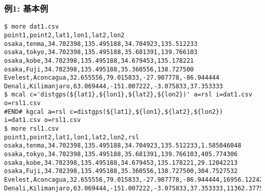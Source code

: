 \subsubsection*{例1: 基本例}



\begin{Verbatim}[baselinestretch=0.7,frame=single]
$ more dat1.csv
point1,point2,lat1,lon1,lat2,lon2
osaka,tenma,34.702398,135.495188,34.704923,135.512233
osaka,tokyo,34.702398,135.495188,35.681391,139.766103
osaka,kobe,34.702398,135.495188,34.679453,135.178221
osaka,Fuji,34.702398,135.495188,35.360556,138.727500
Evelest,Aconcagua,32.655556,79.015833,-27.987778,-86.944444
Denali,Kilimanjaro,63.069444,-151.007222,-3.075833,37.353333
$ mcal c='distgps(${lat1},${lon1},${lat2},${lon2})' a=rsl i=dat1.csv o=rsl1.csv
#END# kgcal a=rsl c=distgps(${lat1},${lon1},${lat2},${lon2}) i=dat1.csv o=rsl1.csv
$ more rsl1.csv
point1,point2,lat1,lon1,lat2,lon2,rsl
osaka,tenma,34.702398,135.495188,34.704923,135.512233,1.585046048
osaka,tokyo,34.702398,135.495188,35.681391,139.766103,405.774306
osaka,kobe,34.702398,135.495188,34.679453,135.178221,29.12042213
osaka,Fuji,34.702398,135.495188,35.360556,138.727500,304.7527532
Evelest,Aconcagua,32.655556,79.015833,-27.987778,-86.944444,16956.12242
Denali,Kilimanjaro,63.069444,-151.007222,-3.075833,37.353333,11362.37758
\end{Verbatim}
